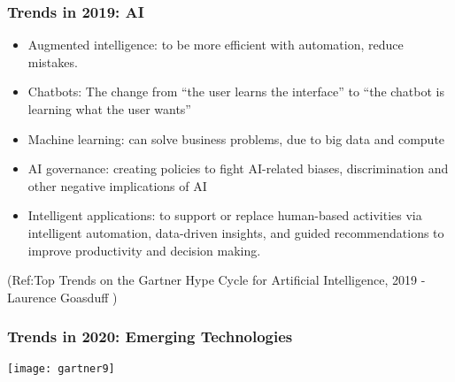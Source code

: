 \begin{frame}[fragile]\frametitle{Trends in 2019: AI}
\begin{itemize}
\item Augmented intelligence: to be more efficient with automation, reduce mistakes.
\item Chatbots: The change from “the user learns the interface” to “the chatbot is learning what the user wants” 
\item Machine learning: can solve business problems, due to big data and compute
\item AI governance: creating policies to fight AI-related biases, discrimination and other negative implications of AI
\item Intelligent applications: to support or replace human-based activities via intelligent automation, data-driven insights, and guided recommendations to improve productivity and decision making. 

\end{itemize}


{\tiny (Ref:Top Trends on the Gartner Hype Cycle for Artificial Intelligence, 2019 - 
Laurence Goasduff )}

\end{frame}

\begin{frame}[fragile]\frametitle{Trends in 2020: Emerging Technologies}

\begin{center}
\texttt{[image: gartner9]}
\end{center}


\end{frame}

